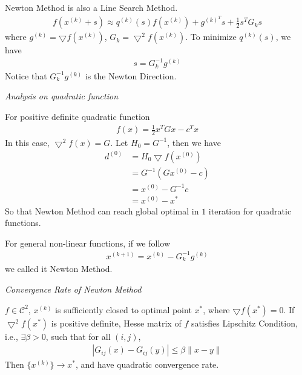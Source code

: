 Newton Method is also a Line Search Method.
\begin{align}
    f(x^{(k)} + s) \approx q^{(k)}(s) f(x^{(k)}) + g^{(k)^T} s
     + \frac{1}{2} s^T G_k s
\end{align}
where $g^{(k)} = \bigtriangledown f(x^{(k)})$,
$G_k = \bigtriangledown^2 f(x^{(k)})$.
To minimize $q^{(k)}(s)$, we have
\begin{align}
    s = G_k^{-1} g^{(k)}
\end{align}
Notice that $G_k^{-1} g^{(k)}$ is the Newton Direction.
\par
\vspace{.3em}
\noindent\textit{Analysis on quadratic function}
\par
For positive definite quadratic function
\begin{align}
    f(x) = \frac{1}{2} x^TGx - c^Tx
\end{align}
In this case, $\bigtriangledown^2 f(x) = G$.
Let $H_0 = G^{-1}$, then we have
\begin{align}
    d^{(0)} &= H_0 \bigtriangledown f(x^{(0)}) \\
    &= G^{-1} (Gx^{(0)} - c) \\
    &= x^{(0)} - G^{-1}c \\
    &= x^{(0)} - x^*
\end{align}
So that Newton Method can reach global optimal
in $1$ iteration for quadratic functions.
\par
For general non-linear functions, if we follow
\begin{align}
    x^{(k+1)} = x^{(k)} - G_k^{-1} g^{(k)}
\end{align}
we called it Newton Method.
\par
\vspace{.3em}
\noindent\textit{Convergence Rate of Newton Method}
\begin{theorem}
    $f \in \mathcal{C}^2$, $x^{(k)}$ is sufficiently closed
    to optimal point $x^*$, where $\bigtriangledown f(x^*) = 0$.
    If $\bigtriangledown^2 f(x^*)$ is positive definite, 
    Hesse matrix of $f$ satisfies Lipschitz Condition, i.e.,
    $\exists \beta >0$, such that for all $(i, j)$,
    \begin{align}
        | G_{ij}(x) - G_{ij}(y)| \leq \beta \parallel x - y \parallel
    \end{align}
    Then $\{x^{(k)}\} \rightarrow x^*$, and have quadratic
    convergence rate.
\end{theorem}
